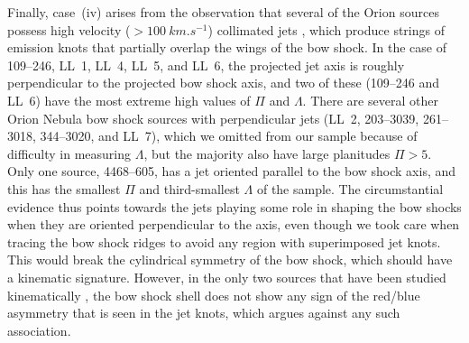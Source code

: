 Finally, case~(iv) arises from the observation that several of the
Orion sources possess high velocity (\(> \SI{100}{km.s^{-1}}\))
collimated jets \citep{Bally:2006a}, which produce strings of emission
knots that partially overlap the wings of the bow shock.  In the case
of 109--246, LL~1, LL~4, LL~5, and LL~6, the projected jet axis is
roughly perpendicular to the projected bow shock axis, and two of
these (109--246 and LL~6) have the most extreme high values of \(\Pi\)
and \(\Lambda\).  There are several other Orion Nebula bow shock sources
with perpendicular jets (LL~2, 203--3039, 261--3018, 344--3020, and
LL~7), which we omitted from our sample because of difficulty in
measuring \(\Lambda\), but the majority also have large planitudes
\(\Pi > 5\). Only one source, 4468--605, has a jet oriented parallel to
the bow shock axis, and this has the smallest \(\Pi\) and third-smallest
\(\Lambda\) of the sample.  The circumstantial evidence thus points towards
the jets playing some role in shaping the bow shocks when they are
oriented perpendicular to the axis, even though we took care when
tracing the bow shock ridges to avoid any region with superimposed jet
knots.  This would break the cylindrical symmetry of the bow shock,
which should have a kinematic signature.  However, in the only two
sources that have been studied kinematically \citep{Henney:2013a}, the
bow shock shell does not show any sign of the red/blue asymmetry that
is seen in the jet knots, which argues against any such association.

